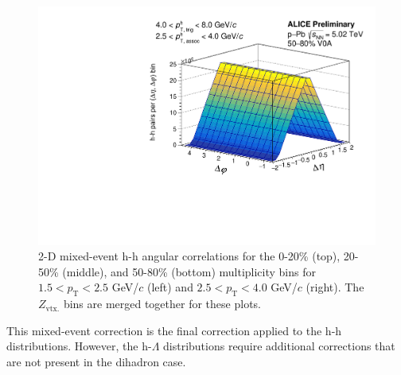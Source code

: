\begin{figure}[ht]
\begin{minipage}{0.48\textwidth}
		\includegraphics[width=\textwidth]{figures/analysis/h_h_2d_mixed_fancy_label_50_80_highpt.pdf}
	\end{minipage}
	\caption{2-D mixed-event h-h angular correlations for the 0-20\% (top), 20-50\% (middle), and 50-80\% (bottom) multiplicity bins for $1.5 < p_{\text{T}} < 2.5$ GeV/$c$ (left) and $2.5 < p_{\text{T}} < 4.0$ GeV/$c$ (right). The $Z_{\text{vtx.}}$ bins are merged together for these plots.}
	\label{fig:h_h_2d_mixed}
\end{figure}

This mixed-event correction is the final correction applied to the h-h distributions. However, the h-$\Lambda$ distributions require additional corrections that are not present in the dihadron case.







